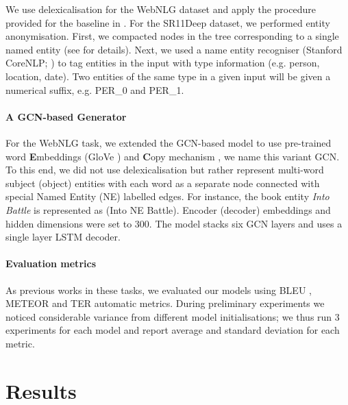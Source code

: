 \documentclass[11pt,a4paper,dvipsnames]{article}
\begin{document}
We use delexicalisation for the WebNLG dataset and apply 
the procedure provided for the baseline in \cite{gardent-EtAl:2017:INLG2017}. 
For the SR11Deep dataset, we performed entity anonymisation. 
First, we compacted nodes in the tree corresponding to a single 
named entity (see \cite{belz2011first} for details). 
Next, we used a name entity recogniser (Stanford CoreNLP; 
\cite{manning-EtAl:2014:P14-5}) to tag entities in the input 
with type information (e.g. person, location, date). Two 
entities of the same type in a given input will be given
a numerical suffix, e.g. PER\_0 and PER\_1.

\paragraph{A GCN-based Generator}
For the WebNLG task, we extended the GCN-based model to use pre-trained word \textbf{E}mbeddings (GloVe \cite{pennington2014glove})
and \textbf{C}opy mechanism \cite{P17-1099}, we name this variant GCN. 
To this end, we did not use delexicalisation but rather
represent multi-word subject (object) entities with each word
as a separate node connected with special Named Entity (NE) labelled edges.
For instance, the book entity \emph{Into Battle} is represented as {\sffamily(Into NE Battle)}.
Encoder (decoder) embeddings and hidden dimensions were set to 300.
The model stacks six GCN layers and uses a single layer LSTM decoder.

\paragraph{Evaluation metrics}
As previous works in these tasks,
we evaluated our models using BLEU \cite{papineni2002bleu}, 
METEOR \cite{denkowski2014meteor} and TER \cite{snover2006study}
automatic metrics.
During preliminary experiments we noticed considerable variance 
from different model initialisations; we thus run 3 experiments 
for each model and report average and standard deviation for each metric.


\section{Results}
\label{sec:results}
\end{document}
